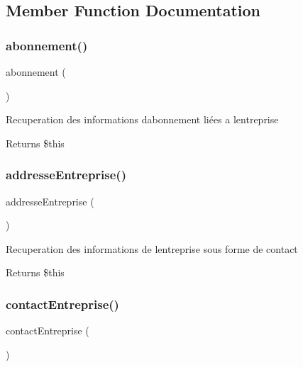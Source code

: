 \subsection{Member Function Documentation}
\mbox{\label{class_app_1_1_entreprise_a51e8aeb6e46daf02623132bfa73a319d}} 
\subsubsection{\texorpdfstring{abonnement()}{abonnement()}}
{\footnotesize\ttfamily abonnement (\begin{DoxyParamCaption}{ }\end{DoxyParamCaption})}

Recuperation des informations d\textquotesingle{}abonnement liées a l\textquotesingle{}entreprise \begin{DoxyReturn}{Returns}
\$this 
\end{DoxyReturn}
\mbox{\label{class_app_1_1_entreprise_a74486920b868f8d3ccb631bbc05fee7c}} 
\subsubsection{\texorpdfstring{addresse\+Entreprise()}{addresseEntreprise()}}
{\footnotesize\ttfamily addresse\+Entreprise (\begin{DoxyParamCaption}{ }\end{DoxyParamCaption})}

Recuperation des informations de l\textquotesingle{}entreprise sous forme de contact \begin{DoxyReturn}{Returns}
\$this 
\end{DoxyReturn}
\mbox{\label{class_app_1_1_entreprise_a90b1d0b2ddd2557bcdd3125549acb099}} 
\subsubsection{\texorpdfstring{contact\+Entreprise()}{contactEntreprise()}}
{\footnotesize\ttfamily contact\+Entreprise (\begin{DoxyParamCaption}{ }\end{DoxyParamCaption})}

